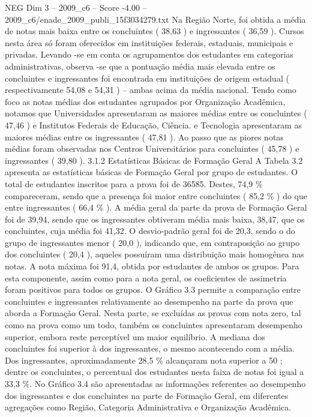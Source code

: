 \begin{textsample}{NEG Dim 3 – 2009\_c6 – Score -4.00 – 2009\_c6/enade\_2009\_publi\_15f3034279.txt}
Na Região Norte, foi obtida a média de notas mais baixa entre os concluintes ( 38,63 ) e ingressantes ( 36,59 ).
Cursos nesta área só foram oferecidos em instituições federais, estaduais, municipais e privadas.
Levando -se em conta os agrupamentos dos estudantes em categorias administrativas, observa -se que a pontuação média mais elevada entre os concluintes e ingressantes foi encontrada em instituições de origem estadual ( respectivamente 54,08 e 54,31 ) – ambas acima da média nacional.
Tendo como foco as notas médias dos estudantes agrupados por Organização Acadêmica, notamos que Universidades apresentaram as maiores médias entre os concluintes ( 47,46 ) e Institutos Federais de Educação, Ciência. e Tecnologia apresentaram as maiores médias entre os ingressantes ( 47,81 ).
Ao passo que as piores notas médias foram observadas nos Centros Universitários para concluintes ( 45,78 ) e ingressantes ( 39,80 ). 3.1.2 Estatísticas Básicas de Formação Geral A Tabela 3.2 apresenta as estatísticas básicas de Formação Geral por grupo de estudantes.
O total de estudantes inscritos para a prova foi de 36585.
Destes, 74,9 \% compareceram, sendo que a presença foi maior entre concluintes ( 85,2 \% ) do que entre ingressantes ( 66,4 \% ).
A média geral da parte da prova de Formação Geral foi de 39,94, sendo que os ingressantes obtiveram média mais baixa, 38,47, que os concluintes, cuja média foi 41,32.
O desvio-padrão geral foi de 20,3, sendo o do grupo de ingressantes menor ( 20,0 ), indicando que, em contraposição ao grupo dos concluintes ( 20,4 ), aqueles possuíram uma distribuição mais homogênea nas notas.
A nota máxima foi 91,4, obtida por estudantes de ambos os grupos.
Para esta componente, assim como para a nota geral, os coeficientes de assimetria foram positivos para todos os grupos.
O Gráfico 3.3 permite a comparação entre concluintes e ingressantes relativamente ao desempenho na parte da prova que aborda a Formação Geral.
Nesta parte, se excluídas as provas com nota zero, tal como na prova como um todo, também os concluintes apresentaram desempenho superior, embora reste perceptível um maior equilíbrio.
A mediana dos concluintes foi superior à dos ingressantes, o mesmo acontecendo com a média.
Dos ingressantes, aproximadamente 28,5 \% alcançaram nota superior a 50 ; dentre os concluintes, o percentual dos estudantes nesta faixa de notas foi igual a 33,3 \%.
No Gráfico 3.4 são apresentadas as informações referentes ao desempenho dos ingressantes e dos concluintes na parte de Formação Geral, em diferentes agregações como Região, Categoria Administrativa e Organização Acadêmica.

\end{textsample}
